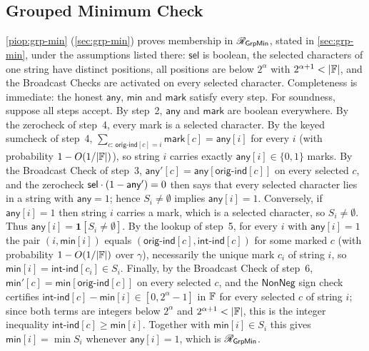 \subsection{Grouped Minimum Check}
\label{sec:proof-grp-min}
\cref{piop:grp-min} (\cref{sec:grp-min}) proves membership in $\mathscr{R}_{\mathsf{GrpMin}}$, stated in \cref{sec:grp-min}, under the assumptions listed there: $\mathsf{sel}$ is boolean, the selected characters of one string have distinct positions, all positions are below $2^\alpha$ with $2^{\alpha+1} < |\mathbb{F}|$, and the Broadcast Checks are activated on every selected character.
Completeness is immediate: the honest $\mathsf{any}$, $\mathsf{min}$ and $\mathsf{mark}$ satisfy every step. For soundness, suppose all steps accept. By step~2, $\mathsf{any}$ and $\mathsf{mark}$ are boolean everywhere. By the zerocheck of step~4, every mark is a selected character. By the keyed sumcheck of step~4, $\sum_{c:\,\mathsf{orig\text{-}ind}[c] = i} \mathsf{mark}[c] = \mathsf{any}[i]$ for every $i$ (with probability $1 - O(1/|\mathbb{F}|)$), so string $i$ carries exactly $\mathsf{any}[i] \in \{0,1\}$ marks. By the Broadcast Check of step~3, $\mathsf{any}'[c] = \mathsf{any}[\mathsf{orig\text{-}ind}[c]]$ on every selected $c$, and the zerocheck $\mathsf{sel}\cdot(1-\mathsf{any}') = 0$ then says that every selected character lies in a string with $\mathsf{any} = 1$; hence $S_i \ne \emptyset$ implies $\mathsf{any}[i] = 1$. Conversely, if $\mathsf{any}[i] = 1$ then string $i$ carries a mark, which is a selected character, so $S_i \ne \emptyset$. Thus $\mathsf{any}[i] = \mathbf{1}[S_i \ne \emptyset]$. By the lookup of step~5, for every $i$ with $\mathsf{any}[i] = 1$ the pair $(i, \mathsf{min}[i])$ equals $(\mathsf{orig\text{-}ind}[c], \mathsf{int\text{-}ind}[c])$ for some marked $c$ (with probability $1 - O(1/|\mathbb{F}|)$ over $\gamma$), necessarily the unique mark $c_i$ of string $i$, so $\mathsf{min}[i] = \mathsf{int\text{-}ind}[c_i] \in S_i$. Finally, by the Broadcast Check of step~6, $\mathsf{min}'[c] = \mathsf{min}[\mathsf{orig\text{-}ind}[c]]$ on every selected $c$, and the $\mathsf{NonNeg}$ sign check certifies $\mathsf{int\text{-}ind}[c] - \mathsf{min}[i] \in [0, 2^\alpha - 1]$ in $\mathbb{F}$ for every selected $c$ of string $i$; since both terms are integers below $2^\alpha$ and $2^{\alpha+1} < |\mathbb{F}|$, this is the integer inequality $\mathsf{int\text{-}ind}[c] \ge \mathsf{min}[i]$. Together with $\mathsf{min}[i] \in S_i$ this gives $\mathsf{min}[i] = \min S_i$ whenever $\mathsf{any}[i] = 1$, which is $\mathscr{R}_{\mathsf{GrpMin}}$.


